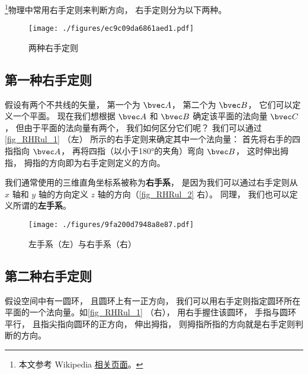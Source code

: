 

\footnote{本文参考 Wikipedia \href{https://en.wikipedia.org/wiki/Right-hand_rule}{相关页面}。}物理中常用右手定则来判断方向， 右手定则分为以下两种。

\begin{figure}[ht]
\centering
\texttt{[image: ./figures/ec9c09da6861aed1.pdf]}
\caption{两种右手定则} \label{fig_RHRul_1}
\end{figure}

\subsection{第一种右手定则}
假设有两个不共线的矢量， 第一个为 $\bvec A$， 第二个为 $\bvec B$， 它们可以定义一个平面。 现在我们想根据 $\bvec A$ 和 $\bvec B$ 确定该平面的法向量 $\bvec C$， 但由于平面的法向量有两个， 我们如何区分它们呢？ 我们可以通过\autoref{fig_RHRul_1} （左） 所示的右手定则来确定其中一个法向量： 首先将右手的四指指向 $\bvec A$， 再将四指（以小于180°的夹角）弯向 $\bvec B$， 这时伸出拇指， 拇指的方向即为右手定则定义的方向。

我们通常使用的三维直角坐标系被称为\textbf{右手系}， 是因为我们可以通过右手定则从 $x$ 轴和 $y$ 轴的方向定义 $z$ 轴的方向（\autoref{fig_RHRul_2} 右）。 同理， 我们也可以定义所谓的\textbf{左手系}。

\begin{figure}[ht]
\centering
\texttt{[image: ./figures/9fa200d7948a8e87.pdf]}
\caption{左手系（左）与右手系（右）} \label{fig_RHRul_2}
\end{figure}

\subsection{第二种右手定则}
假设空间中有一圆环， 且圆环上有一正方向， 我们可以用右手定则指定圆环所在平面的一个法向量。如\autoref{fig_RHRul_1} （右）， 用右手握住该圆环， 手指与圆环平行， 且指尖指向圆环的正方向， 伸出拇指， 则拇指所指的方向就是右手定则判断的方向。

